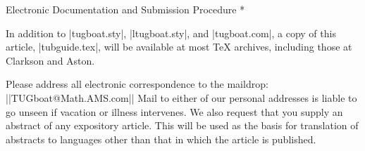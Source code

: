 \head * Electronic Documentation and Submission Procedure *

In addition to |tugboat.sty|, |ltugboat.sty|, and |tugboat.com|,
a copy of this article, |tubguide.tex|, will be available at
most \TeX{} archives, including those at Clarkson and Aston.

Please address all electronic correspondence to the \TUB{} maildrop:
||TUGboat@Math.AMS.com||
Mail to either of our personal addresses is liable to go unseen if
vacation or illness intervenes.  We also request that you supply
an abstract of any expository article.  This will be used as the
basis for translation of abstracts to languages other than that
in which the article is published.


\makesignature

\endarticle
